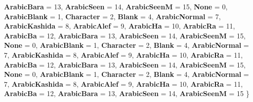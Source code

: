 \begin{DoxyCompactItemize}
{\bfseries Arabic\+Bara} = 13, 
\newline
{\bfseries Arabic\+Seen} = 14, 
{\bfseries Arabic\+SeenM} = 15, 
{\bfseries None} = 0, 
{\bfseries Arabic\+Blank} = 1, 
\newline
{\bfseries Character} = 2, 
{\bfseries Blank} = 4, 
{\bfseries Arabic\+Normal} = 7, 
{\bfseries Arabic\+Kashida} = 8, 
\newline
{\bfseries Arabic\+Alef} = 9, 
{\bfseries Arabic\+Ha} = 10, 
{\bfseries Arabic\+Ra} = 11, 
{\bfseries Arabic\+Ba} = 12, 
\newline
{\bfseries Arabic\+Bara} = 13, 
{\bfseries Arabic\+Seen} = 14, 
{\bfseries Arabic\+SeenM} = 15, 
{\bfseries None} = 0, 
\newline
{\bfseries Arabic\+Blank} = 1, 
{\bfseries Character} = 2, 
{\bfseries Blank} = 4, 
{\bfseries Arabic\+Normal} = 7, 
\newline
{\bfseries Arabic\+Kashida} = 8, 
{\bfseries Arabic\+Alef} = 9, 
{\bfseries Arabic\+Ha} = 10, 
{\bfseries Arabic\+Ra} = 11, 
\newline
{\bfseries Arabic\+Ba} = 12, 
{\bfseries Arabic\+Bara} = 13, 
{\bfseries Arabic\+Seen} = 14, 
{\bfseries Arabic\+SeenM} = 15, 
\newline
{\bfseries None} = 0, 
{\bfseries Arabic\+Blank} = 1, 
{\bfseries Character} = 2, 
{\bfseries Blank} = 4, 
\newline
{\bfseries Arabic\+Normal} = 7, 
{\bfseries Arabic\+Kashida} = 8, 
{\bfseries Arabic\+Alef} = 9, 
{\bfseries Arabic\+Ha} = 10, 
\newline
{\bfseries Arabic\+Ra} = 11, 
{\bfseries Arabic\+Ba} = 12, 
{\bfseries Arabic\+Bara} = 13, 
{\bfseries Arabic\+Seen} = 14, 
\newline
{\bfseries Arabic\+SeenM} = 15
 \}
\end{DoxyCompactItemize}
